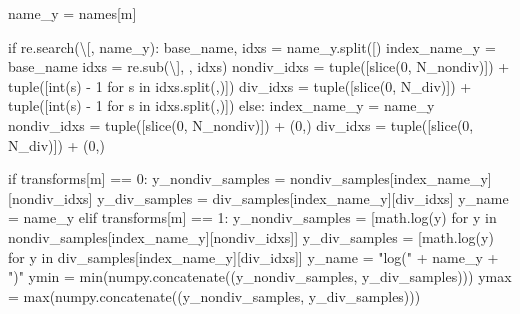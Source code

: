 \documentclass[
  letterpaper,
  DIV=11,
  numbers=noendperiod]{scrartcl}
\newenvironment{Shaded}{\begin{snugshade}}{\end{snugshade}}
\newcommand{\BuiltInTok}[1]{\textcolor[rgb]{0.00,0.23,0.31}{#1}}
\newcommand{\ControlFlowTok}[1]{\textcolor[rgb]{0.00,0.23,0.31}{#1}}
\newcommand{\DecValTok}[1]{\textcolor[rgb]{0.68,0.00,0.00}{#1}}
\newcommand{\KeywordTok}[1]{\textcolor[rgb]{0.00,0.23,0.31}{#1}}
\newcommand{\NormalTok}[1]{\textcolor[rgb]{0.00,0.23,0.31}{#1}}
\newcommand{\OperatorTok}[1]{\textcolor[rgb]{0.37,0.37,0.37}{#1}}
\newcommand{\StringTok}[1]{\textcolor[rgb]{0.13,0.47,0.30}{#1}}
\begin{document}
\begin{Shaded}
\begin{Highlighting}[]
\NormalTok{      name\_y }\OperatorTok{=}\NormalTok{ names[m]}
      
      \ControlFlowTok{if}\NormalTok{ re.search(}\StringTok{\textquotesingle{}\textbackslash{}[\textquotesingle{}}\NormalTok{, name\_y):}
\NormalTok{        base\_name, idxs }\OperatorTok{=}\NormalTok{ name\_y.split(}\StringTok{\textquotesingle{}[\textquotesingle{}}\NormalTok{)}
\NormalTok{        index\_name\_y }\OperatorTok{=}\NormalTok{ base\_name}
\NormalTok{        idxs }\OperatorTok{=}\NormalTok{ re.sub(}\StringTok{\textquotesingle{}\textbackslash{}]\textquotesingle{}}\NormalTok{, }\StringTok{\textquotesingle{}\textquotesingle{}}\NormalTok{, idxs)}
\NormalTok{        nondiv\_idxs }\OperatorTok{=} \BuiltInTok{tuple}\NormalTok{([}\BuiltInTok{slice}\NormalTok{(}\DecValTok{0}\NormalTok{, N\_nondiv)]) }\OperatorTok{+} \BuiltInTok{tuple}\NormalTok{([}\BuiltInTok{int}\NormalTok{(s) }\OperatorTok{{-}} \DecValTok{1} \ControlFlowTok{for}\NormalTok{ s }\KeywordTok{in}\NormalTok{ idxs.split(}\StringTok{\textquotesingle{},\textquotesingle{}}\NormalTok{)])}
\NormalTok{        div\_idxs }\OperatorTok{=} \BuiltInTok{tuple}\NormalTok{([}\BuiltInTok{slice}\NormalTok{(}\DecValTok{0}\NormalTok{, N\_div)]) }\OperatorTok{+} \BuiltInTok{tuple}\NormalTok{([}\BuiltInTok{int}\NormalTok{(s) }\OperatorTok{{-}} \DecValTok{1} \ControlFlowTok{for}\NormalTok{ s }\KeywordTok{in}\NormalTok{ idxs.split(}\StringTok{\textquotesingle{},\textquotesingle{}}\NormalTok{)])}
      \ControlFlowTok{else}\NormalTok{:}
\NormalTok{        index\_name\_y }\OperatorTok{=}\NormalTok{ name\_y}
\NormalTok{        nondiv\_idxs }\OperatorTok{=} \BuiltInTok{tuple}\NormalTok{([}\BuiltInTok{slice}\NormalTok{(}\DecValTok{0}\NormalTok{, N\_nondiv)]) }\OperatorTok{+}\NormalTok{ (}\DecValTok{0}\NormalTok{,)}
\NormalTok{        div\_idxs }\OperatorTok{=} \BuiltInTok{tuple}\NormalTok{([}\BuiltInTok{slice}\NormalTok{(}\DecValTok{0}\NormalTok{, N\_div)]) }\OperatorTok{+}\NormalTok{ (}\DecValTok{0}\NormalTok{,)}
      
      \ControlFlowTok{if}\NormalTok{ transforms[m] }\OperatorTok{==} \DecValTok{0}\NormalTok{:}
\NormalTok{        y\_nondiv\_samples }\OperatorTok{=}\NormalTok{ nondiv\_samples[index\_name\_y][nondiv\_idxs]}
\NormalTok{        y\_div\_samples }\OperatorTok{=}\NormalTok{ div\_samples[index\_name\_y][div\_idxs]}
\NormalTok{        y\_name }\OperatorTok{=}\NormalTok{ name\_y}
      \ControlFlowTok{elif}\NormalTok{ transforms[m] }\OperatorTok{==} \DecValTok{1}\NormalTok{:}
\NormalTok{        y\_nondiv\_samples }\OperatorTok{=}\NormalTok{ [math.log(y) }\ControlFlowTok{for}\NormalTok{ y }\KeywordTok{in}\NormalTok{ nondiv\_samples[index\_name\_y][nondiv\_idxs]]}
\NormalTok{        y\_div\_samples }\OperatorTok{=}\NormalTok{ [math.log(y) }\ControlFlowTok{for}\NormalTok{ y }\KeywordTok{in}\NormalTok{ div\_samples[index\_name\_y][div\_idxs]]}
\NormalTok{        y\_name }\OperatorTok{=} \StringTok{"log("} \OperatorTok{+}\NormalTok{ name\_y }\OperatorTok{+} \StringTok{")"}
\NormalTok{      ymin }\OperatorTok{=} \BuiltInTok{min}\NormalTok{(numpy.concatenate((y\_nondiv\_samples, y\_div\_samples)))}
\NormalTok{      ymax }\OperatorTok{=} \BuiltInTok{max}\NormalTok{(numpy.concatenate((y\_nondiv\_samples, y\_div\_samples)))}
    

\end{Highlighting}
\end{Shaded}
\end{document}
